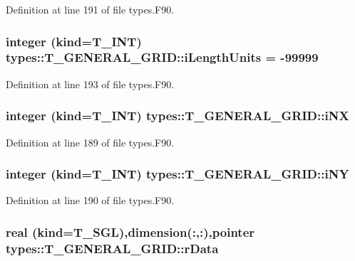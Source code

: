 Definition at line 191 of file types.F90.

\hypertarget{typetypes_1_1_t___g_e_n_e_r_a_l___g_r_i_d_af7072f4f41c1617bc6d4483de288ecef}{
\subsubsection[{iLengthUnits}]{\setlength{\rightskip}{0pt plus 5cm}integer (kind={\bf T\_\-INT}) {\bf types::T\_\-GENERAL\_\-GRID::iLengthUnits} = -\/99999}}
\label{typetypes_1_1_t___g_e_n_e_r_a_l___g_r_i_d_af7072f4f41c1617bc6d4483de288ecef}


Definition at line 193 of file types.F90.

\hypertarget{typetypes_1_1_t___g_e_n_e_r_a_l___g_r_i_d_a602b452f21a1bb62e0679ee1d4242642}{
\subsubsection[{iNX}]{\setlength{\rightskip}{0pt plus 5cm}integer (kind={\bf T\_\-INT}) {\bf types::T\_\-GENERAL\_\-GRID::iNX}}}
\label{typetypes_1_1_t___g_e_n_e_r_a_l___g_r_i_d_a602b452f21a1bb62e0679ee1d4242642}


Definition at line 189 of file types.F90.

\hypertarget{typetypes_1_1_t___g_e_n_e_r_a_l___g_r_i_d_a1df927ec7c6b2f6e1ca55c78fa33161b}{
\subsubsection[{iNY}]{\setlength{\rightskip}{0pt plus 5cm}integer (kind={\bf T\_\-INT}) {\bf types::T\_\-GENERAL\_\-GRID::iNY}}}
\label{typetypes_1_1_t___g_e_n_e_r_a_l___g_r_i_d_a1df927ec7c6b2f6e1ca55c78fa33161b}


Definition at line 190 of file types.F90.

\hypertarget{typetypes_1_1_t___g_e_n_e_r_a_l___g_r_i_d_aeef2b926ed39eb235cbb1a2478e38f4c}{
\subsubsection[{rData}]{\setlength{\rightskip}{0pt plus 5cm}real (kind={\bf T\_\-SGL}),dimension(:,:),pointer {\bf types::T\_\-GENERAL\_\-GRID::rData}}}
\label{typetypes_1_1_t___g_e_n_e_r_a_l___g_r_i_d_aeef2b926ed39eb235cbb1a2478e38f4c}


